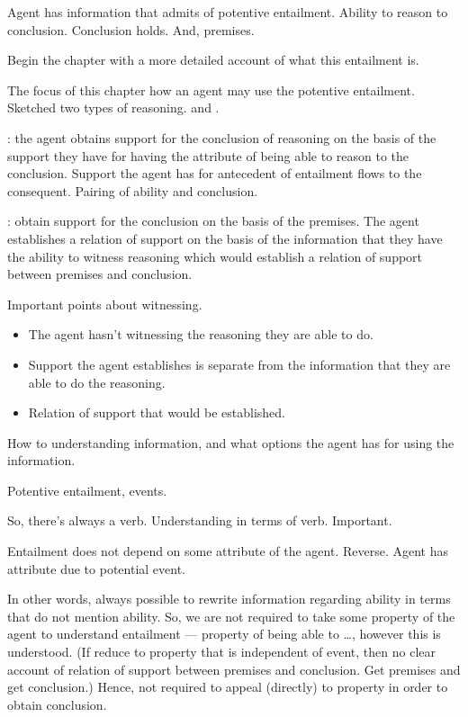 \begin{note}
  Agent has information that admits of potentive entailment.
  Ability to reason to conclusion.
  Conclusion holds.
  And, premises.

  Begin the chapter with a more detailed account of what this entailment is.

  The focus of this chapter how an agent may use the potentive entailment.
  Sketched two types of reasoning.
  \AR{} and \WR{}.

  \AR{}: the agent obtains support for the conclusion of reasoning on the basis of the support they have for having the attribute of being able to reason to the conclusion.
  Support the agent has for antecedent of entailment flows to the consequent.
  Pairing of ability and conclusion.

  \WR{}: obtain support for the conclusion on the basis of the premises.
  The agent establishes a relation of support on the basis of the information that they have the ability to witness reasoning which would establish a relation of support between premises and conclusion.

  Important points about witnessing.
  \begin{itemize}
  \item The agent hasn't witnessing the reasoning they are able to do.
  \item Support the agent establishes is separate from the information that they are able to do the reasoning.
  \item Relation of support that would be established.
  \end{itemize}

  How to understanding information, and what options the agent has for using the information.

  Potentive entailment, events.

  So, there's always a verb.
  Understanding in terms of verb.
  Important.

  Entailment does not depend on some attribute of the agent.
  Reverse.
  Agent has attribute due to potential event.

  In other words, always possible to rewrite information regarding ability in terms that do not mention ability.
  So, we are not required to take some property of the agent to understand entailment --- property of being able to \dots, however this is understood.
  (If reduce to property that is independent of event, then no clear account of relation of support between premises and conclusion.
  Get premises and get conclusion.)
  Hence, not required to appeal (directly) to property in order to obtain conclusion.


\end{note}
